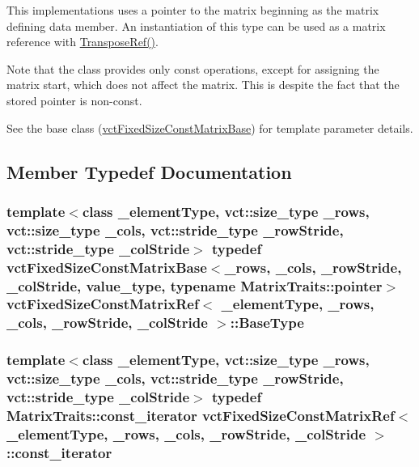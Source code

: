 This implementations uses a pointer to the matrix beginning as the matrix defining data member. An instantiation of this type can be used as a matrix reference with \hyperlink{classvct_fixed_size_const_matrix_base_af8ce7322fff5aa54c0598938041a5096}{Transpose\-Ref()}.

Note that the class provides only const operations, except for assigning the matrix start, which does not affect the matrix. This is despite the fact that the stored pointer is non-\/const.

See the base class (\hyperlink{classvct_fixed_size_const_matrix_base}{vct\-Fixed\-Size\-Const\-Matrix\-Base}) for template parameter details. 

\subsection{Member Typedef Documentation}
\hypertarget{classvct_fixed_size_const_matrix_ref_ac3466e6a4fd2ab31f5f15265e09006d3}{
\subsubsection[{Base\-Type}]{\setlength{\rightskip}{0pt plus 5cm}template$<$class \-\_\-element\-Type, vct\-::size\-\_\-type \-\_\-rows, vct\-::size\-\_\-type \-\_\-cols, vct\-::stride\-\_\-type \-\_\-row\-Stride, vct\-::stride\-\_\-type \-\_\-col\-Stride$>$ typedef {\bf vct\-Fixed\-Size\-Const\-Matrix\-Base}$<$\-\_\-rows, \-\_\-cols, \-\_\-row\-Stride, \-\_\-col\-Stride, value\-\_\-type, typename Matrix\-Traits\-::pointer$>$ {\bf vct\-Fixed\-Size\-Const\-Matrix\-Ref}$<$ \-\_\-element\-Type, \-\_\-rows, \-\_\-cols, \-\_\-row\-Stride, \-\_\-col\-Stride $>$\-::{\bf Base\-Type}}}\label{classvct_fixed_size_const_matrix_ref_ac3466e6a4fd2ab31f5f15265e09006d3}
\hypertarget{classvct_fixed_size_const_matrix_ref_ab035e90a0971ab4bf03d819b5bd31ecc}{
\subsubsection[{const\-\_\-iterator}]{\setlength{\rightskip}{0pt plus 5cm}template$<$class \-\_\-element\-Type, vct\-::size\-\_\-type \-\_\-rows, vct\-::size\-\_\-type \-\_\-cols, vct\-::stride\-\_\-type \-\_\-row\-Stride, vct\-::stride\-\_\-type \-\_\-col\-Stride$>$ typedef {\bf Matrix\-Traits\-::const\-\_\-iterator} {\bf vct\-Fixed\-Size\-Const\-Matrix\-Ref}$<$ \-\_\-element\-Type, \-\_\-rows, \-\_\-cols, \-\_\-row\-Stride, \-\_\-col\-Stride $>$\-::{\bf const\-\_\-iterator}}}\label{classvct_fixed_size_const_matrix_ref_ab035e90a0971ab4bf03d819b5bd31ecc}
